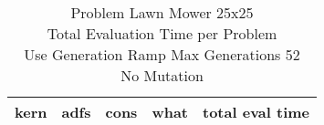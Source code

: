 \begin{table}[H]
\caption{Problem  Lawn Mower 25x25\\Total Evaluation Time per Problem \\ Use Generation Ramp  Max Generations 52\\ No Mutation \\}
\begin{center}
\scalebox{1.0} %
{
\begin{tabular}{llllr}
\hline
kern & adfs & cons & what & total eval time \\
\hline


\end{tabular}
}
\end{center}
\end{table}

